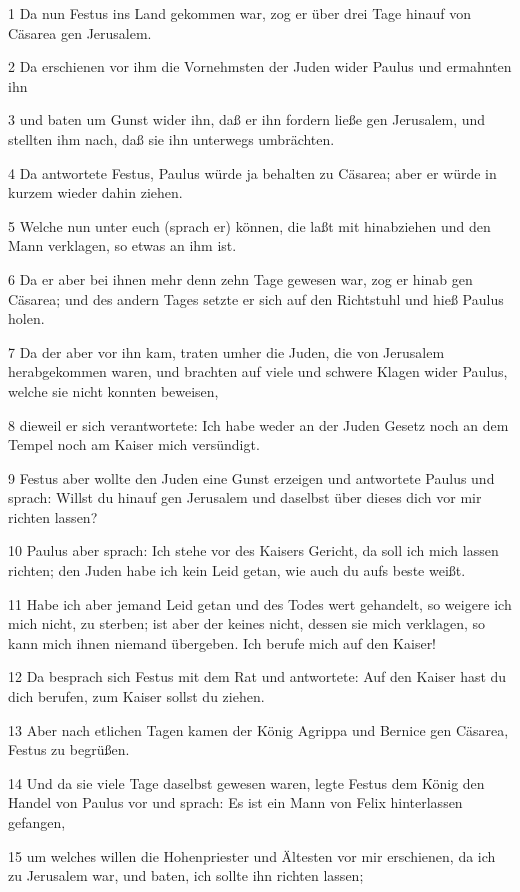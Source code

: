 \par 1 Da nun Festus ins Land gekommen war, zog er über drei Tage hinauf von Cäsarea gen Jerusalem.
\par 2 Da erschienen vor ihm die Vornehmsten der Juden wider Paulus und ermahnten ihn
\par 3 und baten um Gunst wider ihn, daß er ihn fordern ließe gen Jerusalem, und stellten ihm nach, daß sie ihn unterwegs umbrächten.
\par 4 Da antwortete Festus, Paulus würde ja behalten zu Cäsarea; aber er würde in kurzem wieder dahin ziehen.
\par 5 Welche nun unter euch (sprach er) können, die laßt mit hinabziehen und den Mann verklagen, so etwas an ihm ist.
\par 6 Da er aber bei ihnen mehr denn zehn Tage gewesen war, zog er hinab gen Cäsarea; und des andern Tages setzte er sich auf den Richtstuhl und hieß Paulus holen.
\par 7 Da der aber vor ihn kam, traten umher die Juden, die von Jerusalem herabgekommen waren, und brachten auf viele und schwere Klagen wider Paulus, welche sie nicht konnten beweisen,
\par 8 dieweil er sich verantwortete: Ich habe weder an der Juden Gesetz noch an dem Tempel noch am Kaiser mich versündigt.
\par 9 Festus aber wollte den Juden eine Gunst erzeigen und antwortete Paulus und sprach: Willst du hinauf gen Jerusalem und daselbst über dieses dich vor mir richten lassen?
\par 10 Paulus aber sprach: Ich stehe vor des Kaisers Gericht, da soll ich mich lassen richten; den Juden habe ich kein Leid getan, wie auch du aufs beste weißt.
\par 11 Habe ich aber jemand Leid getan und des Todes wert gehandelt, so weigere ich mich nicht, zu sterben; ist aber der keines nicht, dessen sie mich verklagen, so kann mich ihnen niemand übergeben. Ich berufe mich auf den Kaiser!
\par 12 Da besprach sich Festus mit dem Rat und antwortete: Auf den Kaiser hast du dich berufen, zum Kaiser sollst du ziehen.
\par 13 Aber nach etlichen Tagen kamen der König Agrippa und Bernice gen Cäsarea, Festus zu begrüßen.
\par 14 Und da sie viele Tage daselbst gewesen waren, legte Festus dem König den Handel von Paulus vor und sprach: Es ist ein Mann von Felix hinterlassen gefangen,
\par 15 um welches willen die Hohenpriester und Ältesten vor mir erschienen, da ich zu Jerusalem war, und baten, ich sollte ihn richten lassen;

